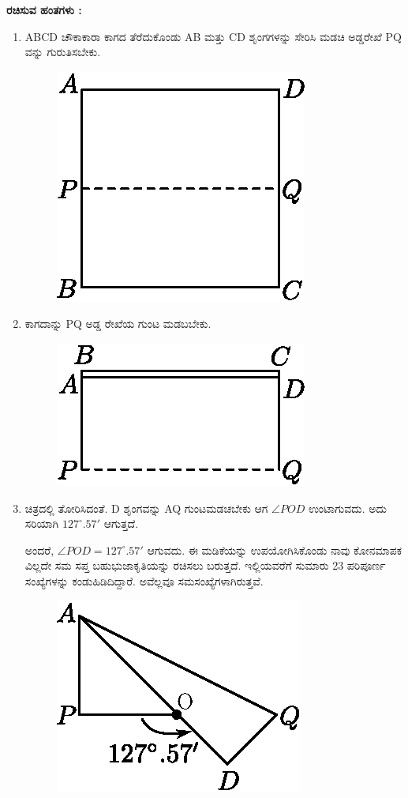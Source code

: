 \medskip
\noindent
\textbf{ರಚಿಸುವ ಹಂತಗಳು :}
\begin{enumerate}
\item ABCD ಚೌಕಾಕಾರಾ ಕಾಗದ ತೆರೆದುಕೊಂಡು  AB ಮತ್ತು CD  ಶೃಂಗಗಳನ್ನು ಸೇರಿಸಿ ಮಡಚಿ ಅಡ್ಡರೇಖೆ PQ ವನ್ನು ಗುರುತಿಸಬೇಕು.
\begin{figure}[H]
\centering
\includegraphics[scale=.98]{src/figure/chap1/fig1-11a.eps}
\end{figure}

\item ಕಾಗದಾನ್ನು PQ ಅಡ್ಡ ರೇಖೆಯ ಗುಂಟ ಮಡಬಬೇಕು.  
\begin{figure}[H]
\centering
\includegraphics[scale=.98]{src/figure/chap1/fig1-11b.eps}
\end{figure}

\item ಚಿತ್ರದಲ್ಲಿ ತೋರಿಸಿದಂತೆ. D ಶೃಂಗವನ್ನು AQ ಗುಂಟಮಡಚಬೇಕು ಆಗ  $\angle POD$ ಉಂಟಾಗುವದು. ಅದು ಸರಿಯಾಗಿ $127^\circ.57'$ ಆಗುತ್ತದೆ. 

ಅಂದರೆ, $\angle POD = 127^\circ.57'$ ಆಗುವದು. ಈ ಮಡಿಕೆಯನ್ನು ಉಪಯೋಗಿಸಿಕೊಂಡು ನಾವು ಕೋನಮಾಪಕ ವಿಲ್ಲದೇ ಸಮ ಸಪ್ತ ಬಹುಭುಜಾಕೃತಿಯನ್ನು ರಚಿಸಲು ಬರುತ್ತದೆ. ಇಲ್ಲಿಯವರೆಗೆ ಸುಮಾರು 23 ಪರಿಪೂರ್ಣ ಸಂಖ್ಯೆಗಳನ್ನು ಕಂಡುಹಿಡಿದಿದ್ದಾರೆ. ಅವೆಲ್ಲವೂ ಸಮಸಂಖ್ಯೆಗಳಾಗಿರುತ್ತವೆ.
\begin{figure}[H]
\centering
\includegraphics[scale=.98]{src/figure/chap1/fig1-11c.eps}
\end{figure}
\end{enumerate}

